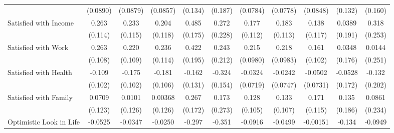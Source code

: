 {\begin{tabular}{l*{10}{c}}
            &    (0.0890)         &    (0.0879)         &    (0.0857)         &     (0.134)         &     (0.187)         &    (0.0784)         &    (0.0778)         &    (0.0848)         &     (0.132)         &     (0.160)         \\
\addlinespace
Satisfied with Income&       0.263\sym{*}  &       0.233\sym{*}  &       0.204         &       0.485\sym{**} &       0.272         &       0.177         &       0.183         &       0.138         &      0.0389         &       0.318         \\
            &     (0.114)         &     (0.115)         &     (0.118)         &     (0.175)         &     (0.228)         &     (0.112)         &     (0.113)         &     (0.117)         &     (0.191)         &     (0.253)         \\
\addlinespace
Satisfied with Work&       0.263\sym{*}  &       0.220\sym{*}  &       0.236\sym{*}  &       0.422\sym{*}  &       0.243         &       0.215\sym{*}  &       0.218\sym{*}  &       0.161         &      0.0348         &      0.0144         \\
            &     (0.108)         &     (0.109)         &     (0.114)         &     (0.195)         &     (0.212)         &    (0.0980)         &    (0.0983)         &     (0.102)         &     (0.176)         &     (0.251)         \\
\addlinespace
Satisfied with Health&      -0.109         &      -0.175         &      -0.181         &      -0.162         &      -0.324\sym{*}  &     -0.0324         &     -0.0242         &     -0.0502         &     -0.0528         &      -0.132         \\
            &     (0.102)         &     (0.102)         &     (0.106)         &     (0.131)         &     (0.154)         &    (0.0719)         &    (0.0747)         &    (0.0731)         &     (0.172)         &     (0.202)         \\
\addlinespace
Satisfied with Family&      0.0709         &      0.0101         &     0.00368         &       0.267         &       0.173         &       0.128         &       0.133         &       0.171         &       0.135         &      0.0861         \\
            &     (0.123)         &     (0.126)         &     (0.126)         &     (0.172)         &     (0.273)         &     (0.105)         &     (0.107)         &     (0.115)         &     (0.186)         &     (0.234)         \\
\addlinespace
Optimistic Look in Life&     -0.0525         &     -0.0347         &     -0.0250         &      -0.297\sym{**} &      -0.351\sym{**} &     -0.0916         &     -0.0499         &    -0.00151         &      -0.134         &     -0.0949         \\

\end{tabular}}
